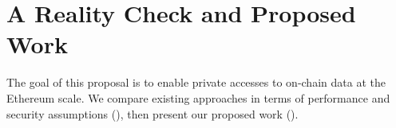 \section{A Reality Check and Proposed Work}

The goal of this proposal is to enable private accesses to on-chain data
at the Ethereum scale. We compare existing approaches in terms of
performance and security assumptions (), then present
our proposed work ().

